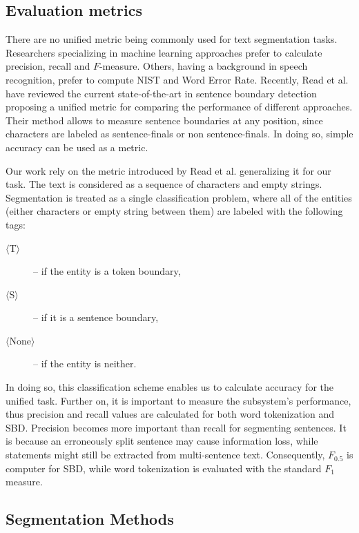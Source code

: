 \subsection{Evaluation metrics}

There are no unified metric being commonly used for text segmentation tasks.
Researchers specializing in machine learning approaches prefer to calculate precision, recall and $F$-measure.
Others, having a  background in speech recognition, prefer to compute NIST and Word Error Rate. 
Recently, Read et al. have reviewed \cite{read2012sentence} the current state-of-the-art in sentence boundary detection proposing a unified metric for comparing the performance of different approaches. 
Their method allows to measure sentence boundaries at any position, since characters are labeled as sentence-finals or non sentence-finals. In doing so, simple accuracy can be used as a metric. 

Our work rely on the metric introduced by Read et al. generalizing it for our task. The text is considered as a sequence of characters and empty strings. Segmentation is treated as a single classification problem, where all of the entities (either characters or empty string between them) are labeled with the following tags: 
\begin{description}
 \item[$\langle$T$\rangle$] --  if the entity is a token boundary,
 \item[$\langle$S$\rangle$] -- if it is a sentence boundary,
 \item[$\langle$None$\rangle$] -- if the entity is neither.
\end{description}
In doing so, this classification scheme enables us to calculate accuracy for the unified task. 
Further on, it is important to measure the subsystem's performance, thus precision and recall values are calculated for both word tokenization and SBD. 
Precision becomes more important than recall for segmenting sentences. It is because
an erroneously split sentence may cause information loss\label{sec:loss}, while statements might still be extracted from multi-sentence text. 
Consequently, $F_{0.5}$ is computer for SBD, while word tokenization is evaluated with the standard $F_1$ measure. 

\subsection{Segmentation Methods}
\label{sec:clinical_segmentation}

